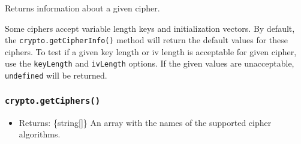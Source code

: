 Returns information about a given cipher.

Some ciphers accept variable length keys and initialization vectors. By
default, the \texttt{crypto.getCipherInfo()} method will return the
default values for these ciphers. To test if a given key length or iv
length is acceptable for given cipher, use the \texttt{keyLength} and
\texttt{ivLength} options. If the given values are unacceptable,
\texttt{undefined} will be returned.

\subsubsection{\texorpdfstring{\texttt{crypto.getCiphers()}}{crypto.getCiphers()}}\label{crypto.getciphers}

\begin{itemize}
\tightlist
\item
  Returns: \{string{[}{]}\} An array with the names of the supported
  cipher algorithms.
\end{itemize}

\begin{Shaded}
\begin{Highlighting}[]
\NormalTok{ \{}
\OperatorTok{,}
\NormalTok{\} }\OperatorTok{=}  \NormalTok{(}\NormalTok{)}\OperatorTok{;}

\NormalTok{(}\NormalTok{())}\OperatorTok{;} 
\end{Highlighting}
\end{Shaded}

\begin{Shaded}
\begin{Highlighting}[]
\NormalTok{ \{}
\OperatorTok{,}
\NormalTok{\} }\OperatorTok{=} \NormalTok{(}\NormalTok{)}\OperatorTok{;}

\NormalTok{(}\NormalTok{())}\OperatorTok{;} 
\end{Highlighting}
\end{Shaded}

